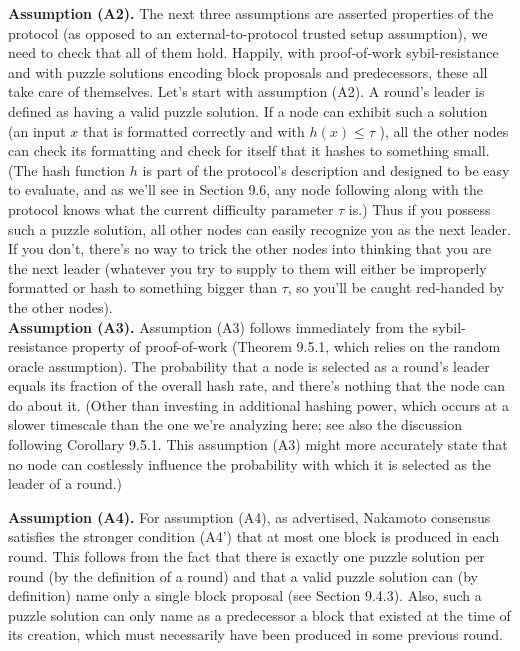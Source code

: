 \noindent
\textbf{Assumption (A2).} The next three assumptions are asserted properties of the protocol
(as opposed to an external-to-protocol trusted setup assumption), we need to check that
all of them hold. Happily, with proof-of-work sybil-resistance and with puzzle solutions
encoding block proposals and predecessors, these all take care of themselves. Let’s start with assumption (A2). A round’s leader is defined as having a valid puzzle solution. If
a node can exhibit such a solution (an input $x$ that is formatted correctly and with $h(x) \leq \tau$ ),
all the other nodes can check its formatting and check for itself that it hashes to something
small. (The hash function $h$ is part of the protocol’s description and designed to be easy
to evaluate, and as we’ll see in Section 9.6, any node following along with the protocol knows
what the current difficulty parameter $\tau$ is.) Thus if you possess such a puzzle solution, all
other nodes can easily recognize you as the next leader. If you don’t, there’s no way to trick
the other nodes into thinking that you are the next leader (whatever you try to supply to
them will either be improperly formatted or hash to something bigger than $\tau$, so you’ll be
caught red-handed by the other nodes).\\

\noindent
\textbf{Assumption (A3).} Assumption (A3) follows immediately from the sybil-resistance property of proof-of-work (Theorem 9.5.1, which relies on the random oracle assumption). The
probability that a node is selected as a round’s leader equals its fraction of the overall
hash rate, and there’s nothing that the node can do about it. (Other than investing in additional hashing power, which occurs at a slower timescale than the one we’re
analyzing here; see also the discussion following Corollary 9.5.1. This assumption (A3) might more accurately
state that no node can costlessly influence the probability with which it is selected as the leader of a round.)

\noindent
\textbf{Assumption (A4).} For assumption (A4), as advertised, Nakamoto consensus 
satisfies the stronger condition (A4’) that at most one block is produced in each round. This
follows from the fact that there is exactly one puzzle solution per round (by the definition
of a round) and that a valid puzzle solution can (by definition) name only a single block
proposal (see Section 9.4.3). Also, such a puzzle solution can only name as a predecessor a
block that existed at the time of its creation, which must necessarily have been produced in
some previous round.\\

